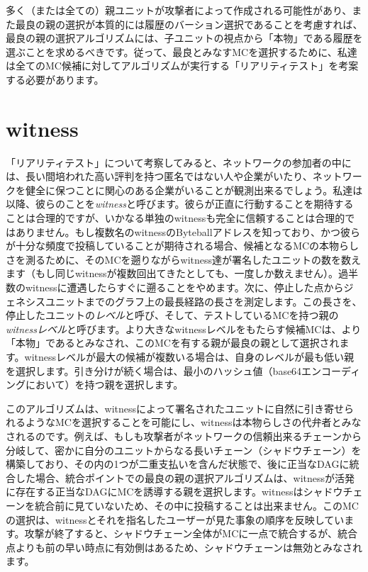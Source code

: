 \documentclass[a4paper, dvipdfmx]{jsarticle}
\begin{document}
多く（または全ての）親ユニットが攻撃者によって作成される可能性があり、また最良の親の選択が本質的には履歴のバーション選択であることを考慮すれば、最良の親の選択アルゴリズムには、子ユニットの視点から「本物」である履歴を選ぶことを求めるべきです。従って、最良とみなすMCを選択するために、私達は全てのMC候補に対してアルゴリズムが実行する「リアリティテスト」を考案する必要があります。

\section{witness}
「リアリティテスト」について考察してみると、ネットワークの参加者の中には、長い間培われた高い評判を持つ匿名ではない人や企業がいたり、ネットワークを健全に保つことに関心のある企業がいることが観測出来るでしょう。私達は以降、彼らのことを\emph{witness}と呼びます。彼らが正直に行動することを期待することは合理的ですが、いかなる単独のwitnessも完全に信頼することは合理的ではありません。もし複数名のwitnessのByteballアドレスを知っており、かつ彼らが十分な頻度で投稿していることが期待される場合、候補となるMCの本物らしさを測るために、そのMCを遡りながらwitness達が署名したユニットの数を数えます（もし同じwitnessが複数回出てきたとしても、一度しか数えません）。過半数のwitnessに遭遇したらすぐに遡ることをやめます。次に、停止した点からジェネシスユニットまでのグラフ上の最長経路の長さを測定します。この長さを、停止したユニットの\emph{レベル}と呼び、そして、テストしているMCを持つ親の\emph{witnessレベル}と呼びます。より大きなwitnessレベルをもたらす候補MCは、より「本物」であるとみなされ、このMCを有する親が最良の親として選択されます。witnessレベルが最大の候補が複数いる場合は、自身のレベルが最も低い親を選択します。引き分けが続く場合は、最小のハッシュ値（base64エンコーディングにおいて）を持つ親を選択します。

このアルゴリズムは、witnessによって署名されたユニットに自然に引き寄せられるようなMCを選択することを可能にし、witnessは本物らしさの代弁者とみなされるのです。例えば、もしも攻撃者がネットワークの信頼出来るチェーンから分岐して、密かに自分のユニットからなる長いチェーン（シャドウチェーン）を構築しており、その内の1つが二重支払いを含んだ状態で、後に正当なDAGに統合した場合、統合ポイントでの最良の親の選択アルゴリズムは、witnessが活発に存在する正当なDAGにMCを誘導する親を選択します。witnessはシャドウチェーンを統合前に見ていないため、その中に投稿することは出来ません。このMCの選択は、witnessとそれを指名したユーザーが見た事象の順序を反映しています。攻撃が終了すると、シャドウチェーン全体がMCに一点で統合するが、統合点よりも前の早い時点に有効側はあるため、シャドウチェーンは無効とみなされます。
\end{document}
